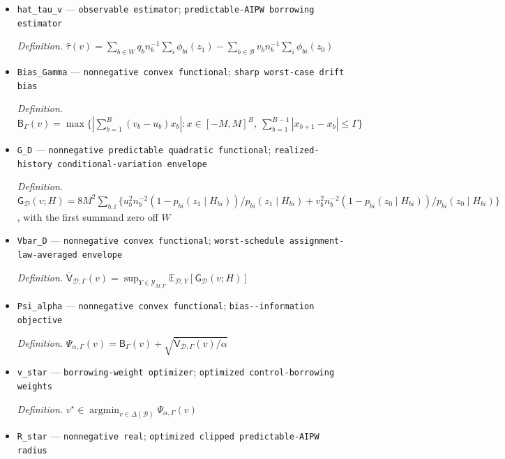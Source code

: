 \documentclass{article}
\begin{document}
\begin{itemize}
  \item \texttt{hat\_\allowbreak{}tau\_\allowbreak{}v} --- \texttt{observable estimator}; \texttt{predictable-\allowbreak{}AIPW borrowing estimator}
  \par\smallskip\noindent\emph{Definition.} \(\widehat\tau(v)=\sum_{b\in W}q_b n_b^{-1}\sum_i\phi_{bi}(z_1)-\sum_{b\in\mathcal B}v_b n_b^{-1}\sum_i\phi_{bi}(z_0)\)
  \item \texttt{Bias\_\allowbreak{}Gamma} --- \texttt{nonnegative convex functional}; \texttt{sharp worst-\allowbreak{}case drift bias}
  \par\smallskip\noindent\emph{Definition.} \(\mathsf B_\Gamma(v)=\max\{|\sum_{b=1}^B(v_b-u_b)x_b|:x\in[-M,M]^B,\ \sum_{b=1}^{B-1}|x_{b+1}-x_b|\le\Gamma\}\)
  \item \texttt{G\_\allowbreak{}D} --- \texttt{nonnegative predictable quadratic functional}; \texttt{realized-\allowbreak{}history conditional-\allowbreak{}variation envelope}
  \par\smallskip\noindent\emph{Definition.} \(\mathsf G_{\mathcal D}(v;H)=8M^2\sum_{b,i}\{u_b^2n_b^{-2}(1-p_{bi}(z_1\mid H_{bi}))/p_{bi}(z_1\mid H_{bi})+v_b^2n_b^{-2}(1-p_{bi}(z_0\mid H_{bi}))/p_{bi}(z_0\mid H_{bi})\}\), with the first summand zero off \(W\)
  \item \texttt{Vbar\_\allowbreak{}D} --- \texttt{nonnegative convex functional}; \texttt{worst-\allowbreak{}schedule assignment-\allowbreak{}law-\allowbreak{}averaged envelope}
  \par\smallskip\noindent\emph{Definition.} \(\overline{\mathsf V}_{\mathcal D,\Gamma}(v)=\sup_{Y\in\mathcal Y_{M,\Gamma}}\mathbb E_{\mathcal D,Y}[\mathsf G_{\mathcal D}(v;H)]\)
  \item \texttt{Psi\_\allowbreak{}alpha} --- \texttt{nonnegative convex functional}; \texttt{bias-\allowbreak{}-\allowbreak{}information objective}
  \par\smallskip\noindent\emph{Definition.} \(\Psi_{\alpha,\Gamma}(v)=\mathsf B_\Gamma(v)+\sqrt{\overline{\mathsf V}_{\mathcal D,\Gamma}(v)/\alpha}\)
  \item \texttt{v\_\allowbreak{}star} --- \texttt{borrowing-\allowbreak{}weight optimizer}; \texttt{optimized control-\allowbreak{}borrowing weights}
  \par\smallskip\noindent\emph{Definition.} \(v^\star\in\operatorname*{argmin}_{v\in\Delta(\mathcal B)}\Psi_{\alpha,\Gamma}(v)\)
  \item \texttt{R\_\allowbreak{}star} --- \texttt{nonnegative real}; \texttt{optimized clipped predictable-\allowbreak{}AIPW radius}

\end{itemize}
\end{document}
